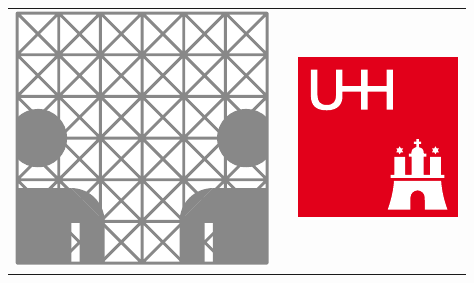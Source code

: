 \documentclass[final]{beamer}
\newlength{\sepwid}
\newlength{\onecolwid}
\newlength{\twocolwid}
\begin{document}
\begin{frame}[t]
\begin{columns}[t]
\begin{column}{\twocolwid}
\begin{columns}[t,totalwidth=\twocolwid]
	\begin{column}{\sepwid}\end{column} %

	\begin{column}{\onecolwid}

		\begin{center}
		\begin{tabular}{ccc}
		\includegraphics[width=0.4\linewidth]{src/infIcon.pdf} & \hfill & \includegraphics[width=0.4\linewidth]{src/uhhIconR.pdf}
		\end{tabular}
		\end{center}
		
	\end{column}
	
\end{columns}

\end{column}


	




\end{columns}
\end{frame}
\end{document}

